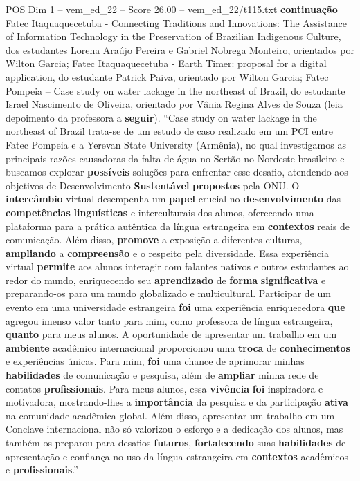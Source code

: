 \begin{textsample}{POS Dim 1 – vem\_ed\_22 – Score 26.00 – vem\_ed\_22/t115.txt}  \label{ex:f1_pos_172}
\textbf{continuação} Fatec Itaquaquecetuba - Connecting Traditions and Innovations: The Assistance of Information Technology in the Preservation of Brazilian Indigenous Culture, dos estudantes Lorena Araújo Pereira e Gabriel Nobrega Monteiro, orientados por Wilton Garcia; Fatec Itaquaquecetuba - Earth Timer: proposal for a digital application, do estudante Patrick Paiva, orientado por Wilton Garcia; Fatec Pompeia – Case study on water lackage in the northeast of Brazil, do estudante Israel Nascimento de Oliveira, orientado por Vânia Regina Alves de Souza (leia depoimento da professora a \textbf{seguir}). “Case study on water lackage in the northeast of Brazil trata-se de um estudo de caso realizado em um PCI entre Fatec Pompeia e a Yerevan State University (Armênia), no qual investigamos as principais razões causadoras da falta de água no Sertão no Nordeste brasileiro e buscamos explorar \textbf{possíveis} soluções para enfrentar esse desafio, atendendo aos objetivos de Desenvolvimento \textbf{Sustentável} \textbf{propostos} pela ONU.
O \textbf{intercâmbio} virtual desempenha um \textbf{papel} crucial no \textbf{desenvolvimento} das \textbf{competências} \textbf{linguísticas} e interculturais dos alunos, oferecendo uma plataforma para a prática autêntica da língua estrangeira em \textbf{contextos} reais de comunicação.
Além disso, \textbf{promove} a exposição a diferentes culturas, \textbf{ampliando} a \textbf{compreensão} e o respeito pela diversidade.
Essa experiência virtual \textbf{permite} aos alunos interagir com falantes nativos e outros estudantes ao redor do mundo, enriquecendo seu \textbf{aprendizado} de \textbf{forma} \textbf{significativa} e preparando-os para um mundo globalizado e multicultural.
Participar de um evento em uma universidade estrangeira \textbf{foi} uma experiência enriquecedora \textbf{que} agregou imenso valor tanto para mim, como professora de língua estrangeira, \textbf{quanto} para meus alunos.
A oportunidade de apresentar um trabalho em um \textbf{ambiente} acadêmico internacional proporcionou uma \textbf{troca} de \textbf{conhecimentos} e experiências únicas.
Para mim, \textbf{foi} uma chance de aprimorar minhas \textbf{habilidades} de comunicação e pesquisa, além de \textbf{ampliar} minha rede de contatos \textbf{profissionais}.
Para meus alunos, essa \textbf{vivência} \textbf{foi} inspiradora e motivadora, mostrando-lhes a \textbf{importância} da pesquisa e da participação \textbf{ativa} na comunidade acadêmica global.
Além disso, apresentar um trabalho em um Conclave internacional não só valorizou o esforço e a dedicação dos alunos, mas também os preparou para desafios \textbf{futuros}, \textbf{fortalecendo} suas \textbf{habilidades} de apresentação e confiança no uso da língua estrangeira em \textbf{contextos} acadêmicos e \textbf{profissionais}.”


\end{textsample}
